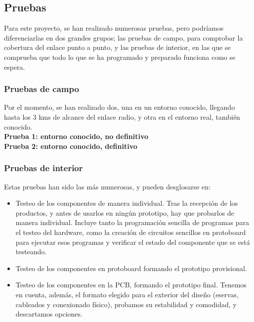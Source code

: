 \documentclass[12pt]{article}
\begin{document}
	\pagebreak	
	
	\subsection[Pruebas]{Pruebas}
	
	\noindent Para este proyecto, se han realizado numerosas pruebas, pero podríamos diferenciarlas en dos grandes grupos; las pruebas de campo, para comprobar la cobertura del enlace punto a punto, y las pruebas de interior, en las que se comprueba que todo lo que se ha programado y preparado funciona como se espera. \\
	
	\subsubsection{Pruebas de campo}
	
	\noindent Por el momento, se han realizado dos, una en un entorno conocido, llegando hasta los 3 kms de alcance del enlace radio, y otra en el entorno real, también conocido. \\
	
	\noindent \textbf{Prueba 1: entorno conocido, no definitivo} \\
	
	\noindent \textbf{Prueba 2: entorno conocido, definitivo} \\

	\subsubsection{Pruebas de interior}
	
	\noindent Estas pruebas han sido las más numerosas, y pueden desglosarse en: \\
	
	\begin{itemize}
		\item Testeo de los componentes de manera individual. Tras la recepción de los productos, y antes de usarlos en ningún prototipo, hay que probarlos de manera individual. Incluye tanto la programación sencilla de programas para el testeo del hardware, como la creación de circuitos sencillos en protoboard para ejecutar esos programas y verificar el estado del componente que se está testeando.
		\item Testeo de los componentes en protoboard formando el prototipo provisional.
		\item Testeo de los componentes en la PCB, formando el prototipo final. Tenemos en cuenta, además, el formato elegido para el exterior del diseño (eservas, cableados y conexionado físico), probamos su estabilidad y comodidad, y descartamos opciones.
	\end{itemize}
	
\end{document}
